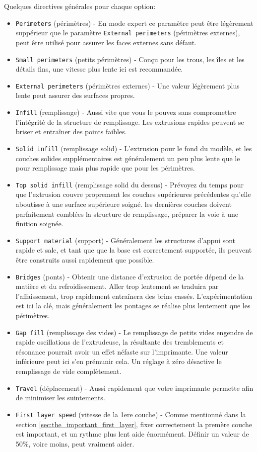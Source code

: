 Quelques directives générales pour chaque option:
\begin{itemize}
	\item \texttt{Perimeters} (périmètres) - En mode expert ce paramètre peut être légèrement suppérieur que le paramètre \texttt{External perimeters} (périmètres externes), peut être utilisé pour assurer les faces externes sans défaut.
	\item \texttt{Small perimeters} (petits périmètres) - Conçu pour les trous, les îles et les détails fins, une vitesse plus lente ici est recommandée.
	\item \texttt{External perimeters} (périmètres externes) - Une valeur légèrement plus lente peut assurer des surfaces propres.
	\item \texttt{Infill} (remplissage) - Aussi vite que vous le pouvez sans compromettre l'intégrité de la structure de remplissage. Les extrusions rapides peuvent se briser et entraîner des points faibles.
	\item \texttt{Solid infill} (remplissage solid) - L'extrusion pour le fond du modèle, et les couches solides supplémentaires est généralement un peu plus lente que le pour remplissage mais plus rapide que pour les périmètres.
	\item \texttt{Top solid infill} (remplissage solid du dessus) - Prévoyez du temps pour que l'extrusion couvre proprement les couches supérieures précédentes qu'elle aboutisse à une surface supérieure soigné. les dernières couches doivent parfaitement comblées la structure de remplissage, préparer la voie à une finition soignée.
	\item \texttt{Support material} (support) - Généralement les structures d'appui sont rapide et sale, et tant que que la base est correctement supportée, ils peuvent être construits aussi rapidement que possible.
	\item \texttt{Bridges} (ponts) - Obtenir une distance d'extrusion de portée dépend de la matière et du refroidissement. Aller trop lentement se traduira par l'affaissement, trop rapidement entraînera des brins cassés. L'expérimentation est ici la clé, mais généralement les pontages se réalise plus lentement que les périmètres.
	\item \texttt{Gap fill} (remplissage des vides) - Le remplissage de petits vides engendre de rapide oscillations de l'extrudeuse, la résultante des tremblements et résonance pourrait avoir un effet néfaste sur l'imprimante. Une valeur inférieure peut ici s'en prémunir cela. Un réglage à zéro désactive le remplissage de vide complètement.
	\item \texttt{Travel} (déplacement) - Aussi rapidement que votre imprimante permette afin de minimiser les suintements.
	\item \texttt{First layer speed} (vitesse de la 1ere couche) - Comme mentionné dans la section \ref{sec:the_important_first_layer}, fixer correctement la premère couche est important, et un rythme plus lent aide énormément. Définir un valeur de 50\%, voire moins, peut vraiment aider.
\end{itemize}

